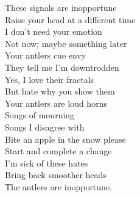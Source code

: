 These signals are inopportune\\
Raise your head at a different time\\
I don't need your emotion\\
Not now; maybe something later\\

Your antlers cue envy\\
They tell me I'm downtrodden\\
Yes, I love their fractals\\
But hate why you show them\\

Your antlers are loud horns\\
Songs of mourning\\
Songs I disagree with\\
Bite an apple in the snow please\\

Start and complete a change\\
I'm sick of these hates\\
Bring back smoother heads\\
The antlers are inopportune.\\

